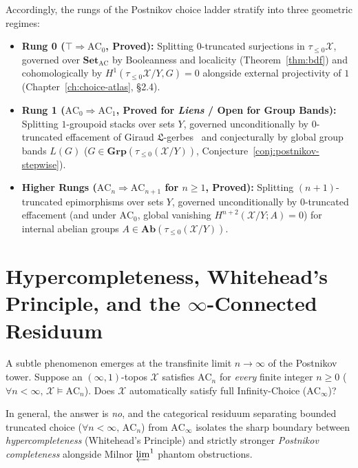 \documentclass[10pt,twoside,openright]{book}
\theoremstyle{crmplain}
\theoremstyle{crmdef}
\theoremstyle{crmremark}
\begin{document}
Accordingly, the rungs of the Postnikov choice ladder stratify into three geometric regimes:

\begin{itemize}[leftmargin=1.5em]

  \item \textbf{Rung 0 ($\top \Rightarrow \mathrm{AC}_0$, Proved):} Splitting $0$-truncated surjections in $\tau_{\le 0}\mathcal{X}$, governed over $\mathbf{Set}_{\mathrm{AC}}$ by Booleanness and localicity (Theorem~\ref{thm:bdf}) and cohomologically by $H^1(\tau_{\le 0}\mathcal{X}/Y, G) = 0$ alongside external projectivity of $1$ (Chapter~\ref{ch:choice-atlas}, \S2.4).

  \item \textbf{Rung 1 ($\mathrm{AC}_0 \Rightarrow \mathrm{AC}_1$, Proved for \emph{Liens} / Open for Group Bands):} Splitting $1$-groupoid stacks over sets $Y$, governed unconditionally by $0$-truncated effacement of Giraud $\mathfrak{L}$-gerbes~\cite[Ch.~IV]{Giraud71} and conjecturally by global group bands $L(G)$ ($G \in \mathbf{Grp}(\tau_{\le 0}(\mathcal{X}/Y))$, Conjecture~\ref{conj:postnikov-stepwise}).

  \item \textbf{Higher Rungs ($\mathrm{AC}_n \Rightarrow \mathrm{AC}_{n+1}$ for $n \ge 1$, Proved):} Splitting $(n+1)$-truncated epimorphisms over sets $Y$, governed unconditionally by $0$-truncated effacement (and under $\mathrm{AC}_0$, global vanishing $H^{n+2}(\mathcal{X}/Y; A) = 0$) for internal abelian groups $A \in \mathbf{Ab}(\tau_{\le 0}(\mathcal{X}/Y))$.

\end{itemize}

\section{\texorpdfstring{Hypercompleteness, Whitehead's Principle, and the $\infty$-Connected Residuum}{Hypercompleteness, Whitehead's Principle, and the infinity-Connected Residuum}}

A subtle phenomenon emerges at the transfinite limit $n \to \infty$ of the Postnikov tower. Suppose an $(\infty, 1)$-topos $\mathcal{X}$ satisfies $\mathrm{AC}_n$ for \emph{every} finite integer $n \ge 0$ ($\forall n < \infty,\, \mathcal{X} \models \mathrm{AC}_n$). Does $\mathcal{X}$ automatically satisfy full Infinity-Choice ($\mathrm{AC}_\infty$)?

In general, the answer is \emph{no}, and the categorical residuum separating bounded truncated choice ($\forall n < \infty,\, \mathrm{AC}_n$) from $\mathrm{AC}_\infty$ isolates the sharp boundary between \emph{hypercompleteness} (Whitehead's Principle) and strictly stronger \emph{Postnikov completeness} alongside Milnor $\varprojlim^1$ phantom obstructions.
\end{document}
